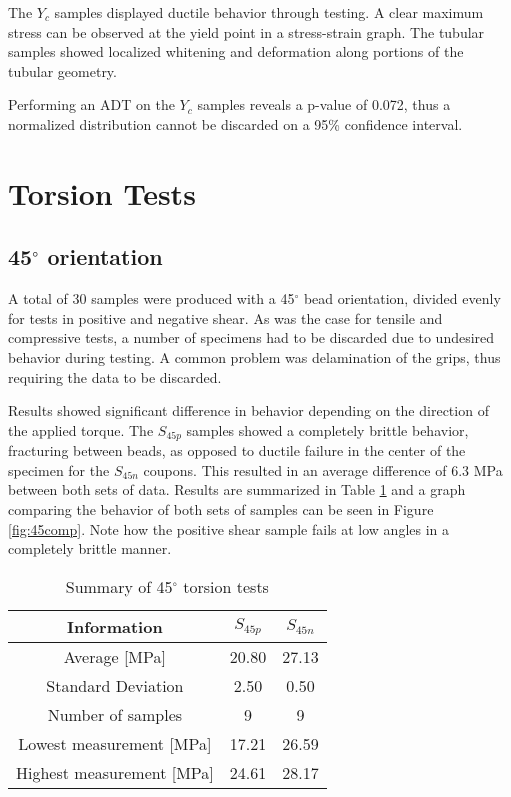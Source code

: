 \documentclass[main.tex]{subfiles}
\begin{document}
The $Y_c$ samples displayed ductile behavior through testing. A clear maximum stress can be observed at the yield point in a stress-strain graph. The tubular samples showed localized whitening and deformation along portions of the tubular geometry.

Performing an ADT on the $Y_c$ samples reveals a p-value of 0.072, thus a normalized distribution cannot be discarded on a 95\% confidence interval. %

\section{Torsion Tests} \label{sec:torsr}
\subsection{45$^\circ$ orientation} \label{ssec:45r}
A total of 30 samples were produced with a 45$^\circ$ bead orientation, divided evenly for tests in positive and negative shear. As was the case for tensile and compressive tests, a number of specimens had to be discarded due to undesired behavior during testing. A common problem was delamination of the grips, thus requiring the data to be discarded. 

Results showed significant difference in behavior depending on the direction of the applied torque. The $S_{45p}$ samples showed a completely brittle behavior, fracturing between beads, as opposed to ductile failure in the center of the specimen for the $S_{45n}$ coupons. This resulted in an average difference of 6.3 MPa between both sets of data. Results are summarized in Table \ref{tab:tors45r} and a graph comparing the behavior of both sets of samples can be seen in Figure \ref{fig:45comp}. Note how the positive shear sample fails at low angles in a completely brittle manner.

\begin{table} [h]
	\centering
	\caption{Summary of 45$^\circ$ torsion tests}
\begin{tabular}{ c| c c } 
	\toprule
	\textbf{Information} & $S_{45p}$ & $S_{45n}$\\
	\midrule
	Average [MPa] & 20.80 & 27.13\\
	Standard Deviation & 2.50 & 0.50\\
	Number of samples & 9 & 9\\
	Lowest measurement [MPa] &17.21  & 26.59\\
	Highest measurement [MPa] &24.61 & 28.17\\
	\bottomrule
\end{tabular}
\label{tab:tors45r}
\end{table}
\end{document}
